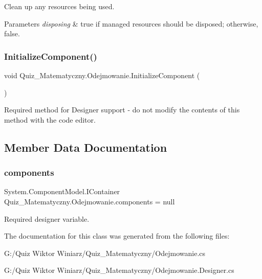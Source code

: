 Clean up any resources being used. 


\begin{DoxyParams}{Parameters}
{\em disposing} & true if managed resources should be disposed; otherwise, false.\\
\hline
\end{DoxyParams}
\mbox{\label{class_quiz___matematyczny_1_1_odejmowanie_a8083368a7f5329a99b77331a43045a03}} 
\subsubsection{\texorpdfstring{InitializeComponent()}{InitializeComponent()}}
{\footnotesize\ttfamily void Quiz\+\_\+\+Matematyczny.\+Odejmowanie.\+Initialize\+Component (\begin{DoxyParamCaption}{ }\end{DoxyParamCaption})\hspace{0.3cm}{\ttfamily [private]}}



Required method for Designer support -\/ do not modify the contents of this method with the code editor. 



\subsection{Member Data Documentation}
\mbox{\label{class_quiz___matematyczny_1_1_odejmowanie_a6e5b31dba0a8df17e1f82b25ac12d610}} 
\subsubsection{\texorpdfstring{components}{components}}
{\footnotesize\ttfamily System.\+Component\+Model.\+I\+Container Quiz\+\_\+\+Matematyczny.\+Odejmowanie.\+components = null\hspace{0.3cm}{\ttfamily [private]}}



Required designer variable. 



The documentation for this class was generated from the following files\+:\begin{DoxyCompactItemize}
\item 
G\+:/\+Quiz Wiktor Winiarz/\+Quiz\+\_\+\+Matematyczny/Odejmowanie.\+cs\item 
G\+:/\+Quiz Wiktor Winiarz/\+Quiz\+\_\+\+Matematyczny/Odejmowanie.\+Designer.\+cs\end{DoxyCompactItemize}

